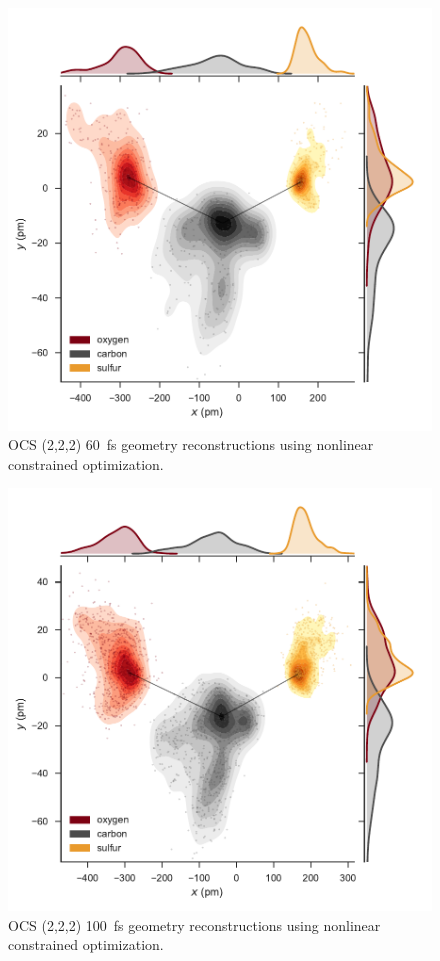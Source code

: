\begin{figure}
  \centering
  \includegraphics[width=\textwidth]{Plots/OCS22260fsMOGeometry}
  \caption[OCS (2,2,2) \SI{60}{\fs} geometry reconstructions using nonlinear constrained optimization.]
  {OCS (2,2,2) \SI{60}{\fs} geometry reconstructions using nonlinear constrained optimization.}
  \label{fig:OCS22260fsMOGeometry}
\end{figure}

\begin{figure}
  \centering
  \includegraphics[width=\textwidth]{Plots/OCS222100fsMOGeometry}
  \caption[OCS (2,2,2) \SI{100}{\fs} geometry reconstructions using nonlinear constrained optimization.]
  {OCS (2,2,2) \SI{100}{\fs} geometry reconstructions using nonlinear constrained optimization.}
  \label{fig:OCS222100fsMOGeometry}
\end{figure}

